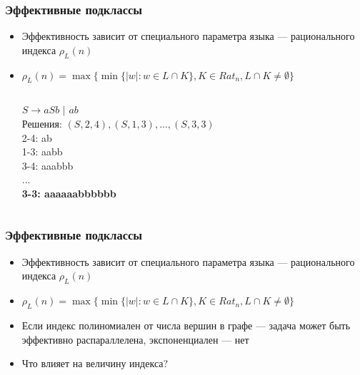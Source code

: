 \documentclass{beamer}
\begin{document}
\begin{frame}
\frametitle{Эффективные подклассы}
\begin{itemize}
\item Эффективность зависит от специального параметра языка --- рационального индекса $\rho_L(n)$
\item $\rho_L(n) = \max\{\min\{|w|:w \in L \cap K\}, K \in {Rat}_n, L \cap K \neq \emptyset\}$
\begin{columns}[c] %


$S \rightarrow aSb$ $|$ $ab$
\\
Решения: $(S, 2, 4), (S, 1, 3), ..., (S, 3, 3)$
\\2-4: ab
\\1-3: aabb
\\3-4: aaabbb
\\ ...
\\\textbf{3-3: aaaaaabbbbbb}


\end{columns}
\end{itemize}
\end{frame}

\begin{frame}
\frametitle{Эффективные подклассы}
\begin{itemize}
\item Эффективность зависит от специального параметра языка --- рационального индекса  $\rho_L(n)$
\item $\rho_L(n) = \max\{\min\{|w|:w \in L \cap K\}, K \in {Rat}_n, L \cap K \neq \emptyset\}$
\item Если индекс полиномиален от числа вершин в графе --- задача может быть эффективно распараллелена, экспоненциален --- нет
\item Что влияет на величину индекса?
\end{itemize}
\end{frame}
\end{document}

